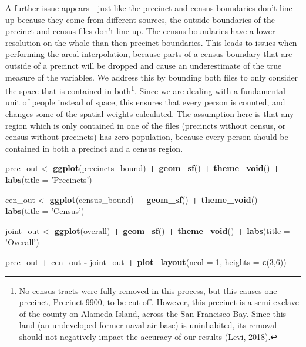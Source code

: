 \documentclass[12pt,twoside]{reedthesis}
\newenvironment{Shaded}{\begin{snugshade}}{\end{snugshade}}
\newcommand{\DataTypeTok}[1]{\textcolor[rgb]{0.13,0.29,0.53}{#1}}
\newcommand{\DecValTok}[1]{\textcolor[rgb]{0.00,0.00,0.81}{#1}}
\newcommand{\KeywordTok}[1]{\textcolor[rgb]{0.13,0.29,0.53}{\textbf{#1}}}
\newcommand{\NormalTok}[1]{#1}
\newcommand{\OperatorTok}[1]{\textcolor[rgb]{0.81,0.36,0.00}{\textbf{#1}}}
\newcommand{\StringTok}[1]{\textcolor[rgb]{0.31,0.60,0.02}{#1}}
\theoremstyle{definition}
\theoremstyle{definition}
\theoremstyle{definition}
\theoremstyle{remark}
\begin{document}
A further issue appears - just like the precinct and census boundaries
don't line up because they come from different sources, the outside
boundaries of the precinct and census files don't line up. The census
boundaries have a lower resolution on the whole than then precinct
boundaries. This leads to issues when performing the areal
interpolation, because parts of a census boundary that are outside of a
precinct will be dropped and cause an underestimate of the true measure
of the variables. We address this by bounding both files to only
consider the space that is contained in both\footnote{No census tracts
  were fully removed in this process, but this causes one precinct,
  Precinct 9900, to be cut off. However, this precinct is a semi-exclave
  of the county on Alameda Island, across the San Francisco Bay. Since
  this land (an undeveloped former naval air base) is uninhabited, its
  removal should not negatively impact the accuracy of our results
  (Levi, 2018).}. Since we are dealing with a fundamental unit of people
instead of space, this ensures that every person is counted, and changes
some of the spatial weights calculated. The assumption here is that any
region which is only contained in one of the files (precincts without
census, or census without precincts) has zero population, because every
person should be contained in both a precinct and a census region.
\begin{Shaded}
\begin{Highlighting}[]
\NormalTok{prec_out <-}\StringTok{ }\KeywordTok{ggplot}\NormalTok{(precincts_bound) }\OperatorTok{+}\StringTok{ }\KeywordTok{geom_sf}\NormalTok{() }\OperatorTok{+}\StringTok{ }\KeywordTok{theme_void}\NormalTok{() }\OperatorTok{+}\StringTok{ }\KeywordTok{labs}\NormalTok{(}\DataTypeTok{title =} \StringTok{'Precincts'}\NormalTok{)}

\NormalTok{cen_out <-}\StringTok{ }\KeywordTok{ggplot}\NormalTok{(census_bound) }\OperatorTok{+}\StringTok{ }\KeywordTok{geom_sf}\NormalTok{() }\OperatorTok{+}\StringTok{ }\KeywordTok{theme_void}\NormalTok{() }\OperatorTok{+}\StringTok{ }\KeywordTok{labs}\NormalTok{(}\DataTypeTok{title =} \StringTok{'Census'}\NormalTok{)}

\NormalTok{joint_out <-}\StringTok{ }\KeywordTok{ggplot}\NormalTok{(overall) }\OperatorTok{+}\StringTok{ }\KeywordTok{geom_sf}\NormalTok{() }\OperatorTok{+}\StringTok{ }\KeywordTok{theme_void}\NormalTok{() }\OperatorTok{+}\StringTok{ }\KeywordTok{labs}\NormalTok{(}\DataTypeTok{title =} \StringTok{'Overall'}\NormalTok{)}

\NormalTok{prec_out }\OperatorTok{+}\StringTok{ }\NormalTok{cen_out }\OperatorTok{-}\StringTok{ }\NormalTok{joint_out }\OperatorTok{+}\StringTok{ }\KeywordTok{plot_layout}\NormalTok{(}\DataTypeTok{ncol =} \DecValTok{1}\NormalTok{, }\DataTypeTok{heights =} \KeywordTok{c}\NormalTok{(}\DecValTok{3}\NormalTok{,}\DecValTok{6}\NormalTok{))}
\end{Highlighting}
\end{Shaded}
\end{document}
